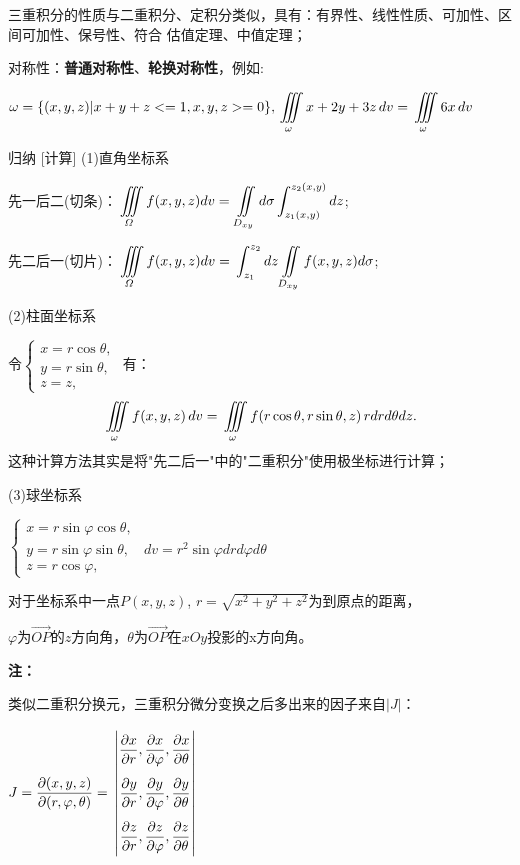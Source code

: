 \documentclass[a4paper,12pt,oneside,fontset=none]{ctexbook}
\let\olddfrac\dfrac
\renewcommand{\dfrac}[2]{
    \olddfrac{#1\vrule width 0pt height 1.15em depth 0em}{#2\vrule width 0pt height 0em depth 0.6em}
}
\let\oldint\int
\renewcommand{\int}{\displaystyle{\vrule width 0pt height 0em depth 0em}\oldint}
\let\oldiint\iint
\renewcommand{\iint}{\displaystyle{\vrule width 0pt height 0em depth 0em}\oldiint}
\let\oldiiint\iiint
\renewcommand{\iiint}{\displaystyle{\vrule width 0pt height 0em depth 0em}\oldiiint}
\newenvironment{induction}[1][]{\begin{thmBox}{归纳}{#1}}{\end{thmBox}}
\newenvironment{note}{
    \par\vspace{0.5em}\noindent
    \textbf{\color{NoteColor} 注：}
}{
    \par\vspace{0.5em}
}
\numberwithin{equation}{chapter}
\begin{document}
三重积分的性质与二重积分、定积分类似，具有：有界性、线性性质、可加性、区间可加性、保号性、符合 估值定理、中值定理；

对称性：\textbf{普通对称性}、\textbf{轮换对称性}，例如:

$\omega = \{ (x,y,z)|x+y+z<=1, x,y,z>=0 \}, \iiint\limits_{\omega} x + 2y + 3z \, dv = \iiint\limits_{\omega}6x \, dv$

\begin{induction}
    [计算]
    (1)直角坐标系

    先一后二(切条)：$\iiint\limits_{\varOmega } f(x,y,z)dv = \iint\limits_{D_{xy}} d\sigma \int_{z_1(x,y)}^{z_2(x,y)} dz$;

    先二后一(切片)：$\iiint\limits_{\varOmega } f(x,y,z)dv = \int_{z_1}^{z_2} dz \iint\limits_{D_{xy}} f(x,y,z) d\sigma$;
    
    (2)柱面坐标系

    令$\begin{cases}
        x = r \cos \theta,\\
        y = r \sin \theta,\\
        z = z,
    \end{cases}$
    有：
    $$\iiint\limits_{\omega} f(x,y,z)\, dv = \iiint\limits_{\omega} f(r \cos \theta,r \sin \theta,z)\, r drd\theta dz.$$
    这种计算方法其实是将"先二后一"中的"二重积分"使用极坐标进行计算；

    (3)球坐标系
    
    $\begin{cases}
        x = r \sin \varphi \cos \theta,\\
        y = r \sin \varphi \sin \theta,\quad dv = r^2 \sin \varphi dr d\varphi d\theta \\
        z = r \cos \varphi,
    \end{cases}$
    
    对于坐标系中一点$P(x,y,z)$, $r = \sqrt{x^2+y^2+z^2}$为到原点的距离，
    
    $\varphi$为$\overrightarrow{OP}$的$z$方向角，$\theta$为$\overrightarrow{OP}$在$xOy$投影的x方向角。


\end{induction}
\begin{note}
类似二重积分换元，三重积分微分变换之后多出来的因子来自$|J|$：

$J = \dfrac{\partial(x,y,z)}{\partial(r,\varphi,\theta)} = $
    $\begin{vmatrix}
        \dfrac{\partial x}{\partial r}, \dfrac{\partial x}{\partial \varphi}, \dfrac{\partial x}{\partial \theta}\\
        \dfrac{\partial y}{\partial r}, \dfrac{\partial y}{\partial \varphi}, \dfrac{\partial y}{\partial \theta}\\
        \dfrac{\partial z}{\partial r}, \dfrac{\partial z}{\partial \varphi}, \dfrac{\partial z}{\partial \theta}
    \end{vmatrix}$
\end{note}
\end{document}
